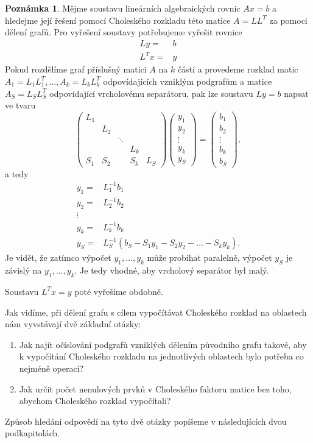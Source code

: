 \documentclass{ctuthesis}
\theoremstyle{plain}
\theoremstyle{definition}
\newtheorem{remark}{Poznámka}
\begin{document}
\begin{remark}
Mějme soustavu lineárních algebraických rovnic $Ax=b$ a hledejme její řešení pomocí Choleského rozkladu této matice $A=LL^T$ za pomoci dělení grafů. Pro vyřešení soustavy potřebujeme vyřešit rovnice
\begin{align*}
  Ly =& b \\
  L^Tx= & y
\end{align*}
Pokud rozdělíme graf příslušný matici $A$ na $k$ částí a provedeme rozklad matic $A_1=L_1 L_1^T, \ldots, A_k=L_k L_k^T$ odpovídajících vzniklým podgrafům a matice $A_S=L_S L_S^T$ odpovídající vrcholovému separátoru, pak lze soustavu $Ly=b$ napsat ve tvaru
\[
\begin{pmatrix}
  L_1 &     &        &      & \\
      & L_2 &        &      & \\
      &     & \ddots &      & \\
      &     &        & L_k  & \\
  S_1 & S_2 &        & S_k  & L_S
\end{pmatrix}
\begin{pmatrix}
  y_1 \\
  y_2 \\
  \vdots \\
  y_k \\
  y_S
\end{pmatrix}
=
\begin{pmatrix}
  b_1 \\
  b_2 \\
  \vdots \\
  b_k \\
  b_S
\end{pmatrix},
\]
a tedy
\begin{align*}
  y_1= & L_1^{-1}b_1 \\
  y_2= & L_2^{-1}b_2 \\
  \vdots \\
  y_k= & L_k^{-1}b_k \\
  y_S= & L_S^{-1}(b_S - S_1 y_1 - S_2 y_2 - \ldots - S_k y_k).
\end{align*}
Je vidět, že zatímco výpočet $y_1, \ldots, y_k$ může probíhat paralelně, výpočet $y_S$ je závislý na $y_1, \ldots, y_k$. Je tedy vhodné, aby vrcholový separátor byl malý.


Soustavu $L^Tx=y$ poté vyřešíme obdobně.
\end{remark}

\medskip

Jak vidíme, při dělení grafu s cílem vypočítávat Choleského rozklad na oblastech nám vyvstávají dvě základní otázky:
\begin{enumerate}
  \item Jak najít očíslování podgrafů vzniklých dělením původního grafu takové, aby k vypočítání Choleského rozkladu na jednotlivých oblastech bylo potřeba co nejméně operací?
  \item Jak určit počet nenulových prvků v Choleského faktoru matice bez toho, abychom Choleského rozklad vypočítali?
\end{enumerate}
Způsob hledání odpovědí na tyto dvě otázky popíšeme v následujících dvou podkapitolách.
\end{document}
